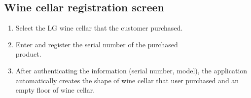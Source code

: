 \documentclass[sigconf, nonacm]{acmart}
\begin{document}
\noindent\subsection{Wine cellar registration screen}

\begin{enumerate}
\item Select the LG wine cellar that the customer purchased.
\item Enter and register the serial number of the purchased \\product.
\item After authenticating the information (serial number, model), the application automatically creates the shape of wine cellar that user purchased and an empty floor of wine cellar.
\end{enumerate}

\end{document}
